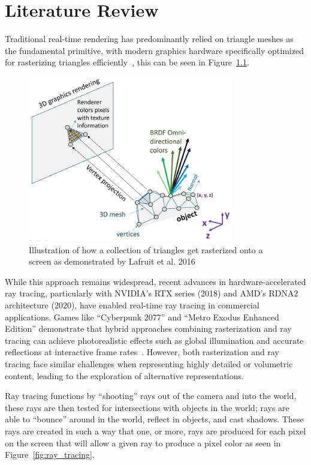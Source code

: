 \chapter{Literature Review}
Traditional real-time rendering has predominantly relied on triangle meshes as the fundamental primitive, with modern
graphics hardware specifically optimized for rasterizing triangles efficiently~\cite{akenine2019real}, this can be seen
in Figure~\ref{fig:triangle_rasterization}.

\begin{figure}[thp]
    \begin{center}
        \includegraphics[width=0.8\textwidth]{figures/mesh_rendering.jpg}
    \end{center}
    \caption{Illustration of how a collection of triangles get rasterized onto a screen as demonstrated by Lafruit et al. 2016}
    \label{fig:triangle_rasterization}
\end{figure}

While this approach remains widespread, recent advances in hardware-accelerated ray tracing, particularly with NVIDIA's
RTX series (2018) and AMD's RDNA2 architecture (2020), have enabled real-time ray tracing in commercial applications.
Games like ``Cyberpunk 2077'' and ``Metro Exodus Enhanced Edition'' demonstrate that hybrid approaches combining
rasterization and ray tracing can achieve photorealistic effects such as global illumination and accurate reflections at
interactive frame rates~\cite{keller2019we}. However, both rasterization and ray tracing face similar challenges when
representing highly detailed or volumetric content, leading to the exploration of alternative representations.

Ray tracing functions by ``shooting'' rays out of the camera and into the world, these rays are then tested for
intersections with objects in the world; rays are able to ``bounce'' around in the world, reflect in objects, and cast
shadows. These rays are created in such a way that one, or more, rays are produced for each pixel on the screen that
will allow a given ray to produce a pixel color as seen in Figure~\ref{fig:ray_tracing}.

